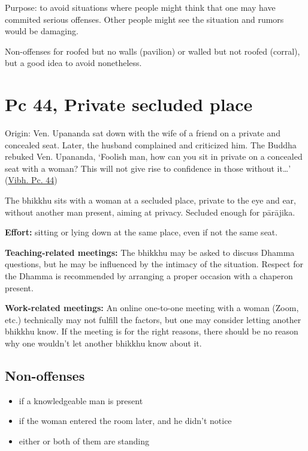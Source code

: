 Purpose: to avoid situations where people might think that one may have
commited serious offenses. Other people might see the situation and
rumors would be damaging.

Non-offenses for roofed but no walls (pavilion) or walled but not roofed
(corral), but a good idea to avoid nonetheless.

\section{Pc 44, Private secluded place}

Origin: Ven. Upananda sat down with the wife of a friend on a private
and concealed seat. Later, the husband complained and criticized him.
The Buddha rebuked Ven. Upananda, `Foolish man, how can you sit in
private on a concealed seat with a woman? This will not give rise to
confidence in those without it\ldots{}'
(\href{https://suttacentral.net/pli-tv-bu-vb-pc44/en/brahmali}{Vibh. Pc.
44})

The bhikkhu sits with a woman at a secluded place, private to the eye
and ear, without another man present, aiming at privacy. Secluded enough
for pārājika.

\textbf{Effort:} sitting or lying down at the same place, even if not
the same seat.

\textbf{Teaching-related meetings:} The bhikkhu may be asked to discuss
Dhamma questions, but he may be influenced by the intimacy of the
situation. Respect for the Dhamma is recommended by arranging a proper
occasion with a chaperon present.

\textbf{Work-related meetings:} An online one-to-one meeting with a
woman (Zoom, etc.) technically may not fulfill the factors, but one may
consider letting another bhikkhu know. If the meeting is for the right
reasons, there should be no reason why one wouldn't let another bhikkhu
know about it.

\subsection{Non-offenses}

\vspace*{-0.5\baselineskip}
\enlargethispage{\baselineskip}

\begin{itemize}
\tightlist
\item
  if a knowledgeable man is present
\item
  if the woman entered the room later, and he didn't notice
\item
  either or both of them are standing
\end{itemize}

